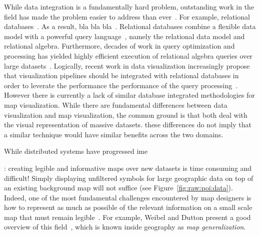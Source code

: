 \documentclass[11pt, oneside]{report}
\begin{document}
While data integration is a fundamentally hard problem, outstanding work in the field has made the problem easier to address than ever~\cite{marcosthesis}. For example, relational databases~\cite{importantdatabasedataintegrationwork}. As a result, bla bla bla~\cite{citeplaceswheretheyareused}. Relational databases combine a flexible data model with a powerful query language~\cite{codd1970relational}, namely the relational data model and relational algebra. Furthermore, decades of work in query optimization and processing has yielded highly efficient execution of relational algebra queries over large datasets~\cite{graefe1993query,kossmann2000survey}. Logically, recent work in data visualization increasingly propose that visualization pipelines should be integrated with relational databases in order to leverate the performance the performance of the query processing~\cite{wu2014case}. However there is currently a lack of similar database integrated methodologies for map visualization. While there are fundamental differences between data visualization and map visualization, the common ground is that both deal with the visual representation of massive datasets. these differences do not imply that a similar technique would have similar benefits across the two domains. %

While distributed systems have progressed ime



: creating legible and informative maps over new datasets is time consuming and difficult! Simply displaying unfiltered symbols for large geographic data on top of an existing background map will not suffice (see Figure~\ref{fig:raw:poi:data}). Indeed, one of the most fundamental challenges encountered by map designers is how to represent as much as possible of the relevant information on a small scale map that must remain legible~\cite{jones2005webage}. For example, Weibel and Dutton present a good overview of this field~\cite{weibel1999generalising}, which is known inside geography as \emph{map generalization}.
\end{document}
